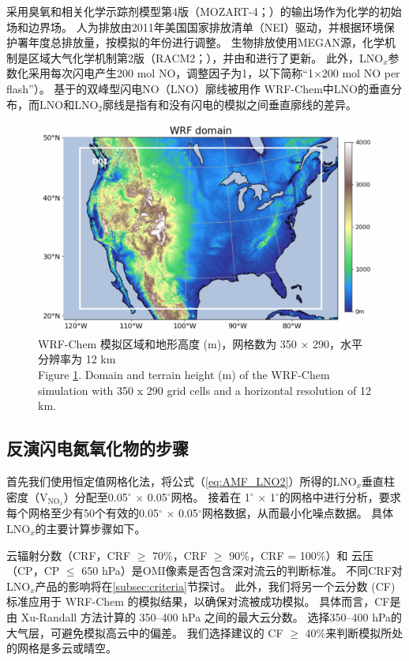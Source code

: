 采用臭氧和相关化学示踪剂模型第4版（MOZART-4；\citet{Emmons.2010}）的输出场作为化学的初始场和边界场。
人为排放由2011年美国国家排放清单（NEI）驱动，并根据环境保护署年度总排放量，按模拟的年份进行调整\citep{EPA.2015}。
生物排放使用MEGAN源，化学机制是区域大气化学机制第2版（RACM2；\citet{Goliff.2013}），并由\citet{Browne.2014}和\citet{Schwantes.2015}进行了更新。
此外，LNO$_x$参数化采用每次闪电产生200 mol NO，调整因子为1，以下简称“1$\times$200 mol NO per flash”）。
基于\citet{Ott.2010}的双峰型闪电NO（LNO）廓线\citep{Laughner.2017}被用作 WRF-Chem中LNO的垂直分布，而LNO和LNO$_2$廓线是指有和没有闪电的模拟之间垂直廓线的差异。


\begin{figure}[h]
\centering
\includegraphics[width=12cm]{./figures/us_domain.png}
\caption{WRF-Chem 模拟区域和地形高度 (m)，网格数为 350 $\times$ 290，水平分辨率为 12 km \\
Figure \ref{fig:us_domain}. Domain and terrain height (m) of the WRF-Chem simulation with 350 x 290 grid cells and a horizontal resolution of 12 km.}
\label{fig:us_domain}
\end{figure}


\subsection{反演闪电氮氧化物的步骤}

首先我们使用恒定值网格化法，将公式（\ref{eq:AMF_LNO2}）所得的LNO$_x$垂直柱密度（V$_{\textrm{NO$_x$}}$）分配至0.05$^{\circ}$ $\times$ 0.05$^{\circ}$网格\citep{Kuhlmann.2014}。
接着在 1$^{\circ}$ $\times$ 1$^{\circ}$的网格中进行分析，要求每个网格至少有50个有效的0.05$^{\circ}$ $\times$ 0.05$^{\circ}$网格数据，从而最小化噪点数据。
具体LNO$_x$的主要计算步骤如下。

云辐射分数（CRF，CRF $\geq$ 70\%，CRF $\geq$ 90\%，CRF = 100\%）和 云压（CP，CP $\leq$ 650 hPa）是OMI像素是否包含深对流云的判断标准\citep{Ziemke.2009,Choi.2014,Pickering.2016}。
不同CRF对LNO$_x$产品的影响将在\ref{subsec:criteria}节探讨。
此外，我们将另一个云分数 (CF) 标准应用于 WRF-Chem 的模拟结果，以确保对流被成功模拟。
具体而言，CF是由 Xu-Randall 方法计算的 350--400 hPa 之间的最大云分数\citep{Xu.1996,Strode.2017}。
选择350--400 hPa的大气层，可避免模拟高云中的偏差。
我们选择\citet{Strode.2017}建议的 CF $\geq$ 40\%来判断模拟所处的网格是多云或晴空。

